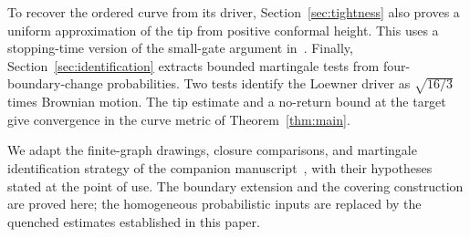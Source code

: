 To recover the ordered curve from its driver, Section~\ref{sec:tightness}
also proves a uniform approximation of the tip from positive conformal
height. This uses a
stopping-time version of the small-gate argument in~\cite{KS}.
Finally, Section~\ref{sec:identification} extracts bounded martingale
tests from four-boundary-change probabilities. Two tests identify the
Loewner driver as $\sqrt{16/3}$ times Brownian motion. The tip estimate
and a no-return bound at the target give convergence in the curve metric
of Theorem~\ref{thm:main}.

We adapt the finite-graph drawings, closure comparisons, and martingale
identification strategy of the companion manuscript~\cite{C}, with
their hypotheses stated at the point of use. The boundary extension
and the covering construction are proved here; the homogeneous
probabilistic inputs are replaced by the quenched estimates established
in this paper.

